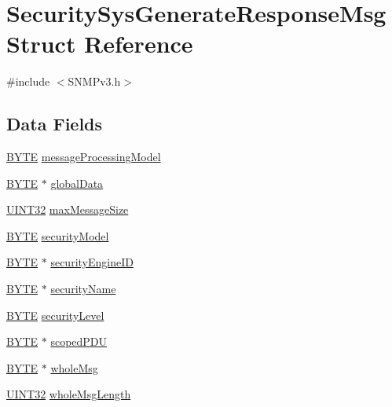 \hypertarget{struct_security_sys_generate_response_msg}{}\section{Security\+Sys\+Generate\+Response\+Msg Struct Reference}
\label{struct_security_sys_generate_response_msg}


{\ttfamily \#include $<$S\+N\+M\+Pv3.\+h$>$}

\subsection*{Data Fields}
\begin{DoxyCompactItemize}
\item 
\hyperlink{_generic_type_defs_8h_a4ae1dab0fb4b072a66584546209e7d58}{B\+Y\+T\+E} \hyperlink{struct_security_sys_generate_response_msg_a47f1a1b8f7a3fe5623fe37df094ac032}{message\+Processing\+Model}
\item 
\hyperlink{_generic_type_defs_8h_a4ae1dab0fb4b072a66584546209e7d58}{B\+Y\+T\+E} $\ast$ \hyperlink{struct_security_sys_generate_response_msg_a5a2fea43d170690b7c0dd51c3486704e}{global\+Data}
\item 
\hyperlink{_generic_type_defs_8h_a1720f33f59b583f0c2ed071815623a86}{U\+I\+N\+T32} \hyperlink{struct_security_sys_generate_response_msg_a4bb188cbbe1cd83f7bba86b6ad7ab509}{max\+Message\+Size}
\item 
\hyperlink{_generic_type_defs_8h_a4ae1dab0fb4b072a66584546209e7d58}{B\+Y\+T\+E} \hyperlink{struct_security_sys_generate_response_msg_ac19ed44216346e9d6c50819813db6867}{security\+Model}
\item 
\hyperlink{_generic_type_defs_8h_a4ae1dab0fb4b072a66584546209e7d58}{B\+Y\+T\+E} $\ast$ \hyperlink{struct_security_sys_generate_response_msg_a51bb3d3b4289b68feb6ae97ffe038fc3}{security\+Engine\+I\+D}
\item 
\hyperlink{_generic_type_defs_8h_a4ae1dab0fb4b072a66584546209e7d58}{B\+Y\+T\+E} $\ast$ \hyperlink{struct_security_sys_generate_response_msg_a4a48a8746988a1f761c3e9eadcc20463}{security\+Name}
\item 
\hyperlink{_generic_type_defs_8h_a4ae1dab0fb4b072a66584546209e7d58}{B\+Y\+T\+E} \hyperlink{struct_security_sys_generate_response_msg_a9314d7b462ce4cc59202ed48fcdd9945}{security\+Level}
\item 
\hyperlink{_generic_type_defs_8h_a4ae1dab0fb4b072a66584546209e7d58}{B\+Y\+T\+E} $\ast$ \hyperlink{struct_security_sys_generate_response_msg_ab8f251f6cafeb71d641a1019102bca43}{scoped\+P\+D\+U}
\item 
\hyperlink{_generic_type_defs_8h_a4ae1dab0fb4b072a66584546209e7d58}{B\+Y\+T\+E} $\ast$ \hyperlink{struct_security_sys_generate_response_msg_a004e34c44705bf128556c60cca7a6586}{whole\+Msg}
\item 
\hyperlink{_generic_type_defs_8h_a1720f33f59b583f0c2ed071815623a86}{U\+I\+N\+T32} \hyperlink{struct_security_sys_generate_response_msg_ae69530a979f1b7b71b437d128ffc63ff}{whole\+Msg\+Length}
\end{DoxyCompactItemize}


